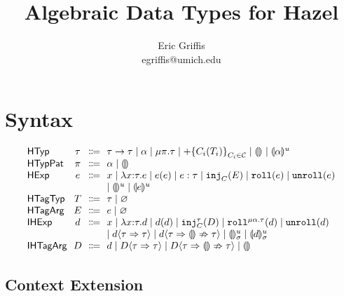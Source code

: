 \documentclass{article}
\title{Algebraic Data Types for Hazel}
\author{Eric Griffis \\ egriffis@umich.edu}
\date{}
\let\originalleft\left
\let\originalright\right
\renewcommand{\left}{\mathopen{}\mathclose\bgroup\originalleft}
\renewcommand{\right}{\aftergroup\egroup\originalright}
\newcommand\Sort[1]{\mathsf{#1}}
\newcommand\IHExp{\Sort{IHExp}}
\newcommand\IHTagArg{\Sort{IHTagArg}}
\newcommand\HExp{\Sort{HExp}}
\newcommand\HTagArg{\Sort{HTagArg}}
\newcommand\HTagTyp{\Sort{HTagTyp}}
\newcommand\HTagVar{\Sort{HTagVar}}
\newcommand\HTyp{\Sort{HTyp}}
\newcommand\HTypPat{\Sort{HTypPat}}
\newcommand\hole[2][]{\llparenthesis#1\rrparenthesis^{#2}}
\newcommand\dhole[3][]{\llparenthesis#1\rrparenthesis_{#2}^{#3}}
\newcommand\Tarrow[2]{#1 \rightarrow #2}
\newcommand\Trec[2]{\mu{#1}.{#2}}
\newcommand\Tsum[1]{+\mathopen{}\left\{#1\right\}}
\newcommand\TagSet{\mathcal{C}}
\newcommand\Absent{\varnothing}
\newcommand\literal[1]{\mathtt{#1}}
\newcommand\asc[2]{{#1}:{#2}}
\newcommand\Efun[3]{\lambda{#1}{:}{#2}.{#3}}
\newcommand\Eapp[2]{{#1}\left({#2}\right)}
\newcommand\Einj[2]{\literal{inj}_{#1}\left({#2}\right)}
\newcommand\Ecase[2]{\literal{case} \left({#1}\right) \left\{{#2}\right\}}
\newcommand\Eroll[1]{\literal{roll}\left(#1\right)}
\newcommand\Eunroll[1]{\literal{unroll}\left(#1\right)}
\newcommand\Dfun[3]{\lambda{#1}{:}{#2}.{#3}}
\newcommand\Dapp[2]{{#1}\left({#2}\right)}
\newcommand\Dinj[3]{\literal{inj}_{#1}^{#2}\left({#3}\right)}
\newcommand\Dcase[2]{\literal{case} \left({#1}\right) \left\{{#2}\right\}}
\newcommand\Droll[3]{\literal{roll}^{\Trec{#1}{#2}}\left({#3}\right)}
\newcommand\Dunroll[1]{\literal{unroll}\left(#1\right)}
\newcommand\cast[3]{{#1}\langle{#2}\Rightarrow{#3}\rangle}
\newcommand\failedcast[3]{{#1}\langle{#2}\Rightarrow{\llparenthesis\rrparenthesis}\nRightarrow{#3}\rangle}
\begin{document}
\maketitle


\section{Syntax}

\[
  \arraycolsep=0pt
  \begin{array}{l@{~~}c@{~~}c@{~~}l}
    \HTyp & \tau & \Coloneqq &
      \Tarrow{\tau}{\tau}
      \mid \alpha
      \mid \Trec{\pi}{\tau}
      \mid \Tsum{C_i(T_i)}_{C_i \in \TagSet}
      \mid \hole{}
      \mid \hole[\alpha]{u}
      \\
    \HTypPat & \pi & \Coloneqq & \alpha \mid \hole{} \\
    \HExp & e & \Coloneqq &
      x
      \mid \Efun{x}{\tau}{e}
      \mid \Eapp{e}{e}
      \mid \asc{e}{\tau}
      \mid \Einj{C}{E}
      \mid \Eroll{e}
      \mid \Eunroll{e}
      \\ & & &
      \mid \hole{u}
      \mid \hole[e]{u}
      \\
    \HTagTyp & T & \Coloneqq & \tau \mid \Absent \\
    \HTagArg & E & \Coloneqq & e \mid \Absent \\
    \IHExp & d & \Coloneqq &
      x
      \mid \Dfun{x}{\tau}{d}
      \mid \Dapp{d}{d}
      \mid \Dinj{C}{\tau}{D}
      \mid \Droll{\alpha}{\tau}{d}
      \mid \Dunroll{d}
      \\ & & &
      \mid \cast{d}{\tau}{\tau}
      \mid \failedcast{d}{\tau}{\tau}
      \mid \dhole{\sigma}{u}
      \mid \dhole[d]{\sigma}{u}
      \\
    \IHTagArg & D & \Coloneqq &
      d
      \mid \cast{D}{\tau}{\tau}
      \mid \failedcast{D}{\tau}{\tau}
      \mid \hole{}
      \\
  \end{array}
\]


\subsection{Context Extension}
\end{document}
